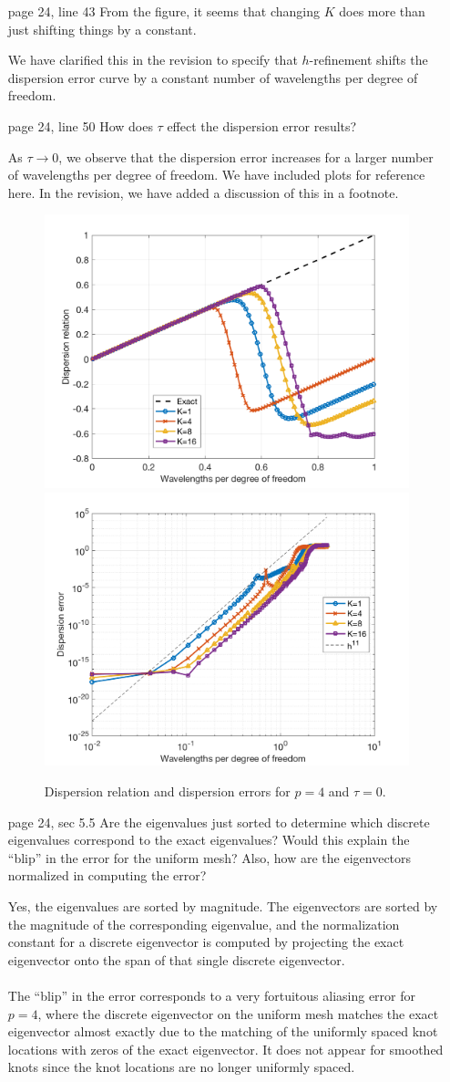 \documentclass[10pt]{article}
\newcommand{\note}[1]{{\color{violet}#1}}
\begin{document}
\begin{enumerate}
\begin{enumerate}
\item [page 24, line 43] From the figure, it seems that changing $K$ does more than just shifting things by a constant.

\note{We have clarified this in the revision to specify that $h$-refinement shifts the dispersion error curve by a constant number of wavelengths per degree of freedom. }

\item [page 24, line 50] How does $\tau$ effect the dispersion error results?

\note{As $\tau\rightarrow 0$, we observe that the dispersion error increases for a larger number of wavelengths per degree of freedom.  We have included plots for reference here.  In the revision, we have added a discussion of this in a footnote.}
\begin{figure}
\centering
\includegraphics[width=.4\textwidth]{tau0dispersionRelation.png}
\includegraphics[width=.4\textwidth]{tau0dispersionError.png}
\caption{Dispersion relation and dispersion errors for $p=4$ and $\tau = 0$.  }
\end{figure}

\item [page 24, sec 5.5] Are the eigenvalues just sorted to determine which discrete eigenvalues correspond to the exact eigenvalues? Would this explain the ``blip'' in the error for the uniform mesh? Also, how are the eigenvectors normalized in computing the error?  

\note{Yes, the eigenvalues are sorted by magnitude.  The eigenvectors are sorted by the magnitude of the corresponding eigenvalue, and the normalization constant for a discrete eigenvector is computed by projecting the exact eigenvector onto the span of that single discrete eigenvector.  
\\
\\
The ``blip'' in the error corresponds to a very fortuitous aliasing error for $p=4$, where the discrete eigenvector on the uniform mesh matches the exact eigenvector almost exactly due to the matching of the uniformly spaced knot locations with zeros of the exact eigenvector.  It does not appear for smoothed knots since the knot locations are no longer uniformly spaced. }

\end{enumerate}
\end{enumerate}
\end{document}
